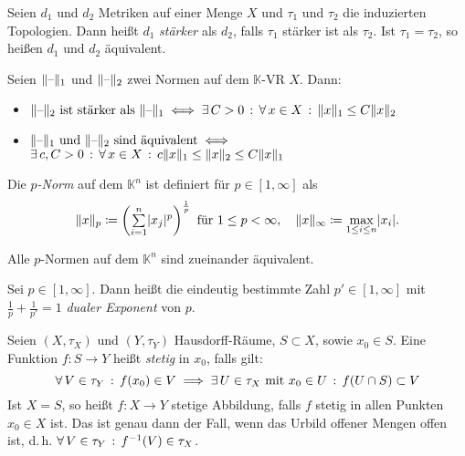 \documentclass{cheat-sheet}
\newcommand{\K}{\mathbb{K}}
\begin{document}
\begin{defn}
  Seien $d_1$ und $d_2$ Metriken auf einer Menge $X$ und $\tau_1$ und $\tau_2$ die induzierten Topologien. Dann heißt $d_1$ \emph{stärker} als $d_2$, falls $\tau_1$ stärker ist als $\tau_2$. Ist $\tau_1 = \tau_2$, so heißen $d_1$ und $d_2$ äquivalent.
\end{defn}


\begin{satz}
  Seien $\lVert\text{--}\rVert_1$ und $\lVert\text{--}\rVert_2$ zwei Normen auf dem $\K$-VR $X$. Dann:
  \begin{itemize}
    \item $\lVert\text{--}\rVert_2 \text{ ist stärker als } \lVert\text{--}\rVert_1 \iff \exists \, {C > 0} \,:\, \forall \, {x \in X} \,:\, \lVert x\rVert_1 \leq C \lVert x\rVert_2$
    \item $\lVert\text{--}\rVert_1 \text{ und } \lVert\text{--}\rVert_2 \text{ sind äquivalent} \iff $\\
    $\exists \, {c, C > 0} \,:\, \forall \, {x \in X} \,:\, c \lVert x\rVert_1 \leq \lVert x\rVert_2 \leq C \lVert x\rVert_1$
  \end{itemize}
\end{satz}

\begin{defn}
  Die \emph{$p$-Norm} auf dem $\K^n$ ist definiert für $p \in \left[ 1, \infty \right]$ als
  \[
    \norm{x}_p \coloneqq \left( \sum_{i = 1}^n \abs{x_j}^p \right)^{\frac{1}{p}} \text{ für } 1 \leq p < \infty, \quad
    \norm{x}_{\infty} \coloneqq \max_{1 \leq i \leq n} \abs{x_i}.
  \]
\end{defn}

\begin{bem}
  Alle $p$-Normen auf dem $\K^n$ sind zueinander äquivalent.
\end{bem}

\begin{defn}
  Sei $p \in \left[ 1, \infty \right]$. Dann heißt die eindeutig bestimmte Zahl $p' \in \left[ 1, \infty \right]$ mit $\tfrac{1}{p} + \tfrac{1}{p'} = 1$ \emph{dualer Exponent} von $p$.
\end{defn}



\begin{defn}
  Seien $(X, \tau_X)$ und $(Y, \tau_Y)$ Hausdorff-Räume, $S \subset X$, sowie $x_0 \in S$. Eine Funktion $f : S \to Y$ heißt \emph{stetig} in $x_0$, falls gilt:
  \[ \forall \, {V \in \tau_Y} \,:\, f(x_0) \in V \implies \exists \, {U \in \tau_X \text{ mit } x_0 \in U} \,:\, f(U \cap S) \subset V \]
  Ist $X = S$, so heißt $f : X \to Y$ stetige Abbildung, falls $f$ stetig in allen Punkten $x_0 \in X$ ist. Das ist genau dann der Fall, wenn das Urbild offener Mengen offen ist, d.\,h. $\forall \, {V \in \tau_Y} \,:\, f^{-1}(V) \in \tau_X$.
\end{defn}
\end{document}
